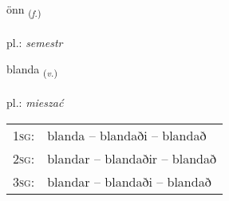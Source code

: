 \documentclass[frontgrid, backgrid]{flacards}\usepackage[]{graphicx}\usepackage[]{xcolor}
\begin{document}
\renewcommand{\blhead}{\vskip5pt {\small\bfseries\footnotesize Nafnorð | Noun }}
\renewcommand{\bcfoot}{\vskip5pt \hspace{2pt}{\small\bfseries\footnotesize 2K}}


{önn \small{\textsubscript{(\textit{f.})}} \\[1ex] %
\textphonetic{[œn]} \\
pl.: \emph{semestr} \\  [2ex]
\renewcommand*{\arraystretch}{0.8}
}

\renewcommand{\flhead}{\vskip5pt \fboxsep=0pt {\small\bfseries\footnotesize Sagnorð | Verb}}
\renewcommand{\fcfoot}{\vskip5pt \fboxsep=0pt \hspace{2pt}{\small\bfseries\footnotesize 2K}}

\renewcommand{\blhead}{\vskip5pt {\small\bfseries\footnotesize Sagnorð | Verb }}
\renewcommand{\bcfoot}{\vskip5pt \hspace{2pt}{\small\bfseries\footnotesize 2K}}


{blanda \small{\textsubscript{(\textit{v.})}} \\[1ex] %
\textphonetic{[planta]} \\
pl.: \emph{mieszać} \\  [2ex]
\renewcommand*{\arraystretch}{0.8}
\begin{tabular}{p{1cm}l}
\textsc{1sg}: & blanda -- blandaði -- blandað \\ 
\textsc{2sg}: & blandar -- blandaðir -- blandað \\ 
\textsc{3sg}: & blandar -- blandaði -- blandað \\ 
\end{tabular}
}

\renewcommand{\flhead}{\vskip5pt \fboxsep=0pt {\small\bfseries\footnotesize Sagnorð | Verb}}
\renewcommand{\fcfoot}{\vskip5pt \fboxsep=0pt \hspace{2pt}{\small\bfseries\footnotesize 2K}}
\end{document}
